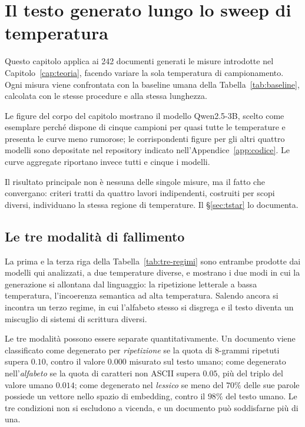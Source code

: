 
\chapter{Il testo generato lungo lo sweep di temperatura}
\label{cap:risultati1}

Questo capitolo applica ai \num{242} documenti generati le misure introdotte nel
Capitolo~\ref{cap:teoria}, facendo variare la sola temperatura di campionamento.
Ogni misura viene confrontata con la baseline umana della
Tabella~\ref{tab:baseline}, calcolata con le stesse procedure e alla stessa
lunghezza.

Le figure del corpo del capitolo mostrano il modello Qwen2.5-3B, scelto come
esemplare perché dispone di cinque campioni per quasi tutte le temperature e
presenta le curve meno rumorose; le corrispondenti figure per gli altri quattro
modelli sono depositate nel repository indicato
nell'Appendice~\ref{app:codice}. Le curve aggregate
riportano invece tutti e cinque i modelli.

Il risultato principale non è nessuna delle singole misure, ma il fatto che
convergano: criteri tratti da quattro lavori indipendenti, costruiti per scopi
diversi, individuano la stessa regione di temperature. Il §\ref{sec:tstar} lo
documenta.

\section{Le tre modalità di fallimento}
\label{sec:fallimenti}

La prima e la terza riga della Tabella~\ref{tab:tre-regimi} sono entrambe
prodotte dai modelli qui analizzati, a due temperature diverse, e mostrano i
due modi in cui la generazione si allontana dal linguaggio: la ripetizione letterale a bassa
temperatura, l'incoerenza semantica ad alta temperatura. Salendo ancora si
incontra un terzo regime, in cui l'alfabeto stesso si disgrega e il testo diventa
un miscuglio di sistemi di scrittura diversi.

Le tre modalità possono essere separate quantitativamente. Un documento viene
classificato come degenerato per \emph{ripetizione} se la quota di 8-grammi
ripetuti supera $0.10$, contro il valore $0.000$ misurato sul testo umano; come
degenerato nell'\emph{alfabeto} se la quota di caratteri non ASCII supera
$0.05$, più del triplo del valore umano $0.014$; come degenerato nel
\emph{lessico} se meno del $70\%$ delle sue parole possiede un vettore nello
spazio di embedding, contro il $98\%$ del testo umano. Le tre condizioni non si
escludono a vicenda, e un documento può soddisfarne più di una.

